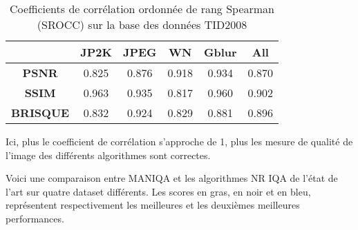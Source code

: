 \documentclass{ieeeaccess}
\begin{document}
\begin{table}[h]
\caption{Coefficients de corrélation ordonnée de rang Spearman (SROCC) sur la base des données TID2008}
\label{table}
\setlength{\tabcolsep}{9pt}
\begin{tabular}{|c|c|c|c|c|c|}
    \hline
    \textbf{ } & \textbf{JP2K} & \textbf{JPEG} & \textbf{WN} & \textbf{Gblur} & \textbf{All} \\
    \hline
    \textbf{PSNR} & 0.825 & 0.876 & 0.918 & 0.934 & 0.870 \\
    \textbf{SSIM} & 0.963 & 0.935 & 0.817 & 0.960 & 0.902 \\
    \textbf{BRISQUE} & 0.832 & 0.924 & 0.829 & 0.881 & 0.896 \\
    \hline
\end{tabular}
\end{table}

Ici, plus le coefficient de corrélation s’approche de 1, plus les mesure de qualité de l’image des différents algorithmes sont correctes.

 Voici une comparaison entre MANIQA et les algorithmes NR IQA de l’état de l’art sur quatre dataset différents. Les scores en gras, en noir et en bleu, représentent respectivement les meilleures et les deuxièmes meilleures performances.
\end{document}

